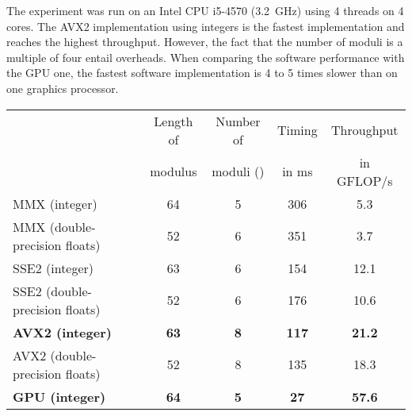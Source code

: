 \documentclass[runningheads,orivec]{llncs}
\begin{document}
The experiment was run on an Intel CPU i5-4570 (3.2~GHz) using 4 threads on 4 cores. The AVX2 implementation using integers is the fastest implementation and reaches the highest throughput. However, the fact that the number of moduli is a multiple of four entail overheads. When comparing the software performance with the GPU one, the fastest software implementation is 4 to 5 times slower than on one graphics processor. 

\vspace*{-0.25cm}



\begin{center}
    \begin{tabular}{|l||c|c|c|c|}
      \hline
        & \footnotesize Length of & \footnotesize Number of &  \footnotesize Timing & \footnotesize Throughput\\
	    & \footnotesize modulus & \footnotesize moduli () &  \footnotesize in ms & \footnotesize in GFLOP/s\\
      \hline
      \hline
      \footnotesize MMX (integer) & \footnotesize 64 & \footnotesize 5 & \footnotesize 306 & \footnotesize 5.3\\
      \footnotesize MMX (double-precision floats) & \footnotesize 52 & \footnotesize 6 & \footnotesize 351 & \footnotesize 3.7\\
      \footnotesize SSE2 (integer) & \footnotesize 63 & \footnotesize 6 & \footnotesize 154 & \footnotesize 12.1\\
\footnotesize SSE2 (double-precision floats) & \footnotesize 52 & \footnotesize 6 & \footnotesize 176 & \footnotesize 10.6\\
      \bf \footnotesize AVX2 (integer) & \bf \footnotesize 63 & \bf \footnotesize 8 & \bf \footnotesize 117 & \bf \footnotesize 21.2\\
      \footnotesize AVX2 (double-precision floats) & \footnotesize 52 & \footnotesize 8 & \footnotesize 135 & \footnotesize 18.3\\
      \bf \footnotesize GPU (integer) & \bf  \footnotesize 64 & \bf \footnotesize 5 & \bf  \footnotesize 27 & \bf \footnotesize 57.6\\

      \hline
    \end{tabular}
\end{center}


\vspace*{-0.5cm}
\end{document}

